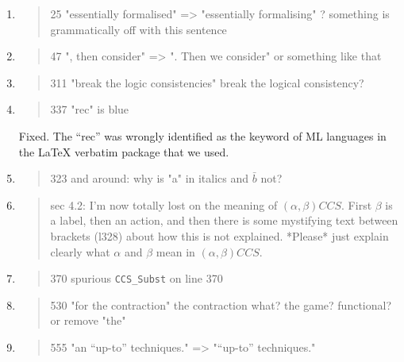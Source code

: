 \begin{enumerate}
  \item \begin{quote}
25 "essentially formalised" => "essentially formalising" ? something is grammatically off with this sentence
\end{quote}
  \Mark

  \item \begin{quote}
47 ", then consider" => ". Then we consider" or something like that
\end{quote}
  \Mark

  \item \begin{quote}
311 "break the logic consistencies" break the logical consistency?
\end{quote}
  \Mark

  \item \begin{quote}
337 "rec" is blue
\end{quote}
  \Mark Fixed. The ``rec'' was wrongly identified as the keyword of ML
  languages in the \LaTeX{} verbatim package that we used.

  \item \begin{quote}
323 and around: why is "a" in italics and $\bar{b}$ not?
\end{quote}
  \Mark

  \item \begin{quote}
sec 4.2: I'm now totally lost on the meaning of $(\alpha, \beta) CCS$. First $\beta$ is a label, then an action, and then there is some mystifying text between brackets (l328) about how this is not explained. *Please* just explain clearly what $\alpha$ and $\beta$ mean in $(\alpha, \beta) CCS$. 
\end{quote}
  \Mark

  \item \begin{quote}
370 spurious \texttt{CCS_Subst} on line 370
\end{quote}
  \Mark

  \item \begin{quote}
530 "for the contraction" the contraction what? the game? functional? or remove "the"
\end{quote}
  \Mark

  \item \begin{quote}
555 "an “up-to” techniques." => "“up-to” techniques."
\end{quote}
  \Mark


\end{enumerate}

